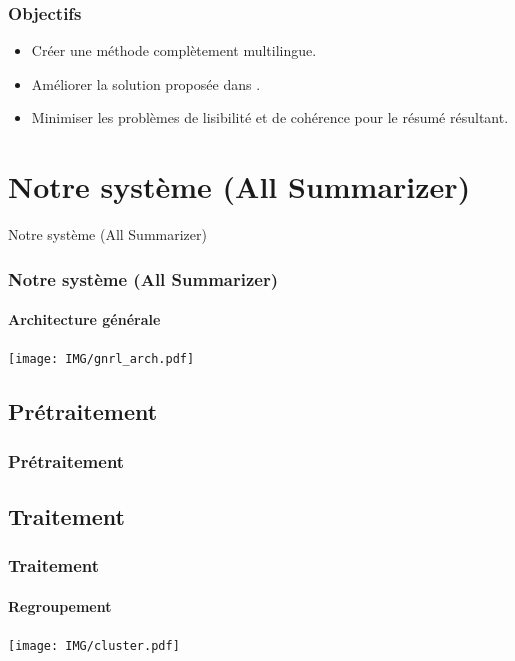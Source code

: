 \documentclass{beamer}
\begin{document}
\begin{frame}
\frametitle{Objectifs}

\begin{itemize}
\item Créer une méthode complètement multilingue.
\item Améliorer la solution proposée dans \cite{13-aries-al}.
\item Minimiser les problèmes de lisibilité et de cohérence pour le résumé résultant.
\end{itemize}
\end{frame}

\section{Notre système (All Summarizer)}
\begin{frame}
\begin{center}
{\Huge Notre système (All Summarizer)}
\end{center}
\end{frame}

\begin{frame}
\frametitle{Notre système (All Summarizer)}
\framesubtitle{Architecture générale}

\begin{center}
\texttt{[image: IMG/gnrl\_arch.pdf]}
\end{center}

\end{frame}

\subsection{Prétraitement}

\begin{frame}
\frametitle{Prétraitement}

\begin{center}
\scriptsize

\end{center}

\end{frame}

\subsection{Traitement}

\begin{frame}
\frametitle{Traitement}
\framesubtitle{Regroupement}
\begin{center}
\texttt{[image: IMG/cluster.pdf]}
\end{center}
\end{frame}
\end{document}
